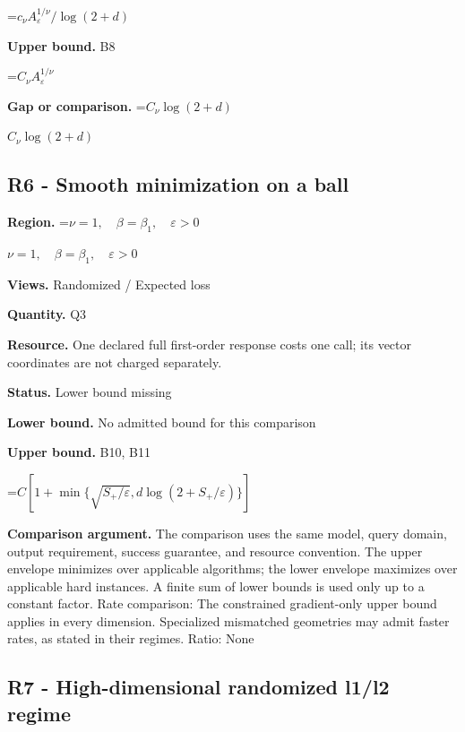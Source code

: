 \documentclass[10pt,a4paper]{article}
\newcommand{\AtlasMath}[1]{\par\begingroup\centering\setbox0=\hbox{$\displaystyle #1$}\ifdim\wd0>1.4\linewidth\typeout{ATLAS WIDE FORMULA: \the\wd0}\fi\ifdim\wd0>\linewidth\resizebox{\linewidth}{!}{\box0}\else\box0\fi\par\endgroup}
\newcommand{\AtlasInlineMath}[1]{\begingroup\setbox0=\hbox{$#1$}\ifdim\wd0>.4\linewidth\endgroup\AtlasMath{#1}\else\endgroup$#1$\fi}
\begin{document}
\AtlasMath{c_\nu A_\varepsilon^{1/\nu}/\log(2+d)}


\textbf{Upper bound.} B8



\AtlasMath{C_\nu A_\varepsilon^{1/\nu}}


\textbf{Gap or comparison.} \AtlasInlineMath{C_\nu\log(2+d)}



\subsection{R6 - Smooth minimization on a ball}


\textbf{Region.} \AtlasInlineMath{\nu=1,\quad\beta=\beta_1,\quad\varepsilon>0}



\textbf{Views.} Randomized / Expected loss



\textbf{Quantity.} Q3



\textbf{Resource.} One declared full first-order response costs one call; its vector coordinates are not charged separately.



\textbf{Status.} Lower bound missing



\textbf{Lower bound.} No admitted bound for this comparison



\textbf{Upper bound.} B10, B11



\AtlasMath{C[1+\min\{\sqrt{S_+/\varepsilon},d\log(2+S_+/\varepsilon)\}]}


\textbf{Comparison argument.} The comparison uses the same model, query domain, output requirement, success guarantee, and resource convention. The upper envelope minimizes over applicable algorithms; the lower envelope maximizes over applicable hard instances. A finite sum of lower bounds is used only up to a constant factor. Rate comparison: The constrained gradient-only upper bound applies in every dimension. Specialized mismatched geometries may admit faster rates, as stated in their regimes. Ratio: None



\subsection{R7 - High-dimensional randomized l1/l2 regime}
\end{document}
